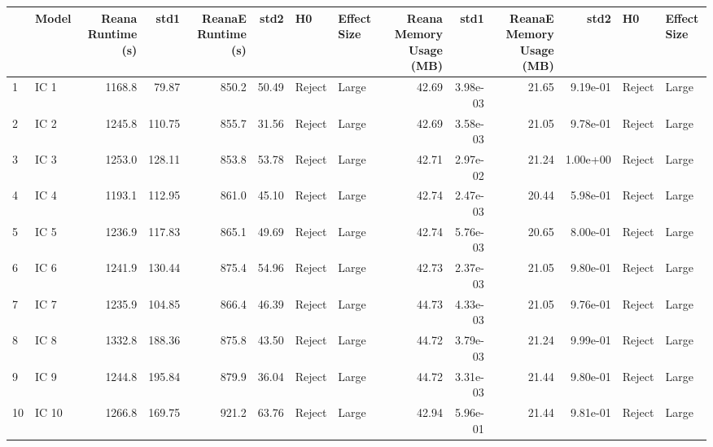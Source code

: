 \begin{tabular}{llrrrrllrrrrll}
\toprule
{} &  Model &  Reana Runtime (s) &    std1 &  ReanaE Runtime (s) &   std2 &      H0 & Effect Size &  Reana Memory Usage (MB) &      std1 &  ReanaE Memory Usage (MB) &      std2 &      H0 & Effect Size \\
\midrule
1  &   IC 1 &             1168.8 &   79.87 &               850.2 &  50.49 &  Reject &       Large &                    42.69 &  3.98e-03 &                     21.65 &  9.19e-01 &  Reject &       Large \\
2  &   IC 2 &             1245.8 &  110.75 &               855.7 &  31.56 &  Reject &       Large &                    42.69 &  3.58e-03 &                     21.05 &  9.78e-01 &  Reject &       Large \\
3  &   IC 3 &             1253.0 &  128.11 &               853.8 &  53.78 &  Reject &       Large &                    42.71 &  2.97e-02 &                     21.24 &  1.00e+00 &  Reject &       Large \\
4  &   IC 4 &             1193.1 &  112.95 &               861.0 &  45.10 &  Reject &       Large &                    42.74 &  2.47e-03 &                     20.44 &  5.98e-01 &  Reject &       Large \\
5  &   IC 5 &             1236.9 &  117.83 &               865.1 &  49.69 &  Reject &       Large &                    42.74 &  5.76e-03 &                     20.65 &  8.00e-01 &  Reject &       Large \\
6  &   IC 6 &             1241.9 &  130.44 &               875.4 &  54.96 &  Reject &       Large &                    42.73 &  2.37e-03 &                     21.05 &  9.80e-01 &  Reject &       Large \\
7  &   IC 7 &             1235.9 &  104.85 &               866.4 &  46.39 &  Reject &       Large &                    44.73 &  4.33e-03 &                     21.05 &  9.76e-01 &  Reject &       Large \\
8  &   IC 8 &             1332.8 &  188.36 &               875.8 &  43.50 &  Reject &       Large &                    44.72 &  3.79e-03 &                     21.24 &  9.99e-01 &  Reject &       Large \\
9  &   IC 9 &             1244.8 &  195.84 &               879.9 &  36.04 &  Reject &       Large &                    44.72 &  3.31e-03 &                     21.44 &  9.80e-01 &  Reject &       Large \\
10 &  IC 10 &             1266.8 &  169.75 &               921.2 &  63.76 &  Reject &       Large &                    42.94 &  5.96e-01 &                     21.44 &  9.81e-01 &  Reject &       Large \\

\end{tabular}
